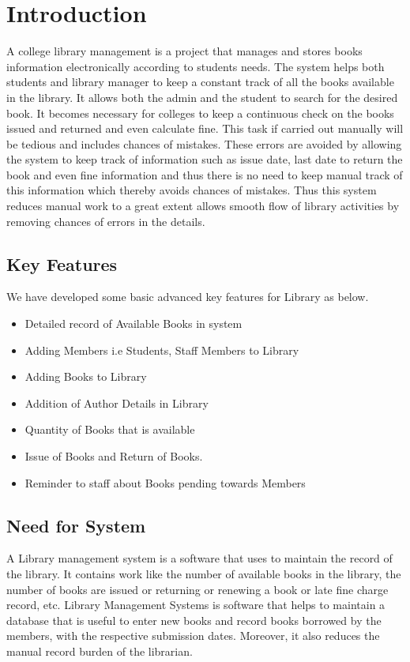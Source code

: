 \documentclass[12pt, a4paper]{report}
\begin{document}
	\newpage
	
\clearpage
\chapter{Introduction}

\hspace{1cm} A college library management is a project that manages and stores books information electronically
according to students needs. The system helps both students and library manager to keep a constant
track of all the books available in the library. It allows both the admin and the student to search for
the desired book. It becomes necessary for colleges to keep a continuous check on the books issued
and returned and even calculate fine. This task if carried out manually will be tedious and includes
chances of mistakes. These errors are avoided by allowing the system to keep track of information
such as issue date, last date to return the book and even fine information and thus there is no need to
keep manual track of this information which thereby avoids chances of mistakes. Thus this system
reduces manual work to a great extent allows smooth flow of library activities by removing chances
of errors in the details.

\section{Key Features}
We have developed some basic advanced key features for Library as below.
\begin{itemize}
	\item Detailed record of Available Books in system
	\item Adding Members i.e Students, Staff Members to Library
	\item Adding Books to Library
	\item Addition of Author Details in Library
	\item Quantity of Books that is available 
	\item Issue of Books and Return of Books.
	\item Reminder to staff about Books pending towards Members
\end{itemize}

\newpage
\section{Need for System}
A Library management system is a software that uses to maintain the record of the library. It contains work like the number of available books in the library, the number of books are issued or returning or renewing a book or late fine charge record, etc. Library Management Systems is software that helps to maintain a database that is useful to enter new books and record books borrowed by the members, with the respective submission dates. Moreover, it also reduces the manual record burden of the librarian.
\end{document}

